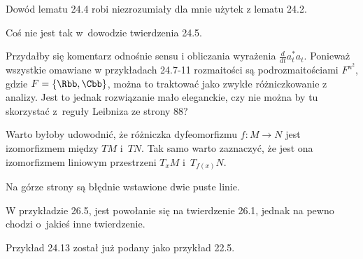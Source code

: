 \documentclass[a4paper,11pt]{article}
\numberwithin{equation}{section}
\begin{document}
\noindent
{} Dowód lematu 24.4 robi niezrozumiały dla mnie użytek
z lematu 24.2.

\vspace{\spaceFour}





\noindent
{} Coś nie jest tak w~dowodzie twierdzenia 24.5.

\vspace{\spaceFour}





\noindent
{} Przydałby się komentarz odnośnie sensu i obliczania
wyrażenia $\frac{ d }{ dt } a^{ * }_{ t } a_{ t }$. Ponieważ wszystkie
omawiane w przykładach 24.7-11 rozmaitości są podrozmaitościami
$F^{ n^{ 2 } }$, gdzie $F = \{ \Rbb, \Cbb \}$, można
to traktować jako zwykłe różniczkowanie z analizy. Jest to jednak
rozwiązanie mało eleganckie, czy nie można by tu skorzystać z~reguły
Leibniza ze strony 88?

\vspace{\spaceFour}





\noindent
Warto byłoby udowodnić, że różniczka dyfeomorfizmu
$f : M \to N$ jest izomorfizmem między $TM$ i~$TN$. Tak samo warto
zaznaczyć, że jest ona izomorfizmem liniowym przestrzeni $T_{ x }M$
i~$T_{ f( x ) }N$.

\vspace{\spaceFour}





\noindent
{} Na górze strony są błędnie wstawione dwie puste linie.

\vspace{\spaceFour}





\noindent
{} W przykładzie 26.5, jest powołanie się na twierdzenie
26.1, jednak na pewno chodzi o~jakieś inne twierdzenie.

\vspace{\spaceFour}





\noindent
{} Przykład 24.13 został już podany jako przykład 22.5.

\vspace{\spaceFour}
\end{document}
